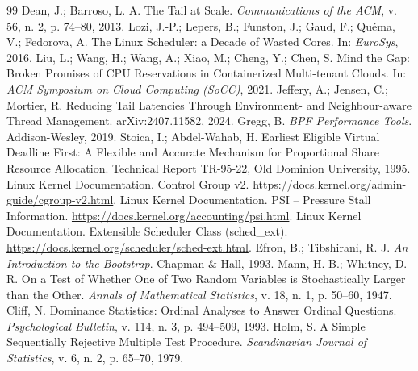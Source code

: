 \documentclass[12pt,a4paper]{article}
\begin{document}
\begin{thebibliography}{99}
 Dean, J.; Barroso, L. A. The Tail at Scale. \textit{Communications of the ACM}, v. 56, n. 2, p. 74--80, 2013.
 Lozi, J.-P.; Lepers, B.; Funston, J.; Gaud, F.; Quéma, V.; Fedorova, A. The Linux Scheduler: a Decade of Wasted Cores. In: \textit{EuroSys}, 2016.
 Liu, L.; Wang, H.; Wang, A.; Xiao, M.; Cheng, Y.; Chen, S. Mind the Gap: Broken Promises of CPU Reservations in Containerized Multi-tenant Clouds. In: \textit{ACM Symposium on Cloud Computing (SoCC)}, 2021.
 Jeffery, A.; Jensen, C.; Mortier, R. Reducing Tail Latencies Through Environment- and Neighbour-aware Thread Management. arXiv:2407.11582, 2024.
 Gregg, B. \textit{BPF Performance Tools}. Addison-Wesley, 2019.
 Stoica, I.; Abdel-Wahab, H. Earliest Eligible Virtual Deadline First: A Flexible and Accurate Mechanism for Proportional Share Resource Allocation. Technical Report TR-95-22, Old Dominion University, 1995.
 Linux Kernel Documentation. Control Group v2. \url{https://docs.kernel.org/admin-guide/cgroup-v2.html}.
 Linux Kernel Documentation. PSI -- Pressure Stall Information. \url{https://docs.kernel.org/accounting/psi.html}.
 Linux Kernel Documentation. Extensible Scheduler Class (sched\_ext). \url{https://docs.kernel.org/scheduler/sched-ext.html}.
 Efron, B.; Tibshirani, R. J. \textit{An Introduction to the Bootstrap}. Chapman \& Hall, 1993.
 Mann, H. B.; Whitney, D. R. On a Test of Whether One of Two Random Variables is Stochastically Larger than the Other. \textit{Annals of Mathematical Statistics}, v. 18, n. 1, p. 50--60, 1947.
 Cliff, N. Dominance Statistics: Ordinal Analyses to Answer Ordinal Questions. \textit{Psychological Bulletin}, v. 114, n. 3, p. 494--509, 1993.
 Holm, S. A Simple Sequentially Rejective Multiple Test Procedure. \textit{Scandinavian Journal of Statistics}, v. 6, n. 2, p. 65--70, 1979.
\end{thebibliography}
\end{document}
